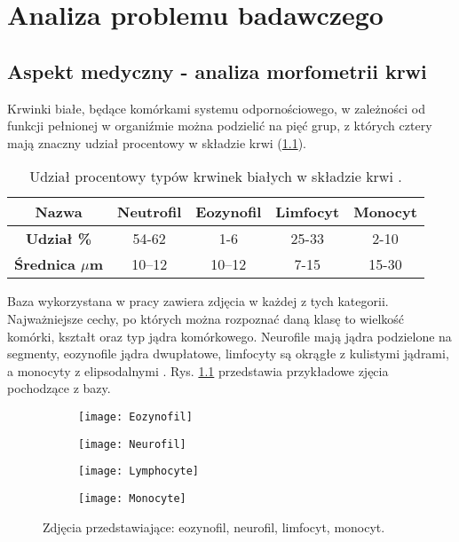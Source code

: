 \chapter{Analiza problemu badawczego}
\label{cha:analiza_problemu_badawczego}

\section{Aspekt medyczny - analiza morfometrii krwi}
Krwinki białe, będące komórkami systemu odpornościowego, w zależności od funkcji pełnionej w organiźmie można podzielić na pięć grup, z których cztery mają znaczny udział procentowy w składzie krwi (\ref{tab:blood_cells_percentage}).
\begin{table}[h!]
\centering
\caption[Short Heading]{Udział procentowy typów krwinek białych w składzie krwi \cite{Wheater1979FunctionalHA}.}
\label{tab:blood_cells_percentage}
\begin{tabular}{|c|c|c|c|c|}
\hline
\textbf{Nazwa}                               & Neutrofil & Eozynofil & Limfocyt & Monocyt \\ \hline
\textbf{Udział \%} & 54-62   & 1-6    & 25-33  & 2-10  \\ \hline
\textbf{Średnica  \textbf{$\mu$}m} & 10–12  & 10–12 & 7-15  & 15-30  \\ \hline
\end{tabular}
\end{table}

{\parindent0pt %
Baza wykorzystana w pracy zawiera zdjęcia w każdej z tych kategorii. Najważniejsze cechy, po których można rozpoznać daną klasę to wielkość komórki, kształt oraz typ jądra komórkowego. Neurofile mają jądra podzielone na segmenty, eozynofile jądra dwupłatowe, limfocyty są okrągłe z kulistymi jądrami, a monocyty z elipsodalnymi \cite{lymphocytes_nucleus}. Rys. \ref{fig:subcaption_example} przedstawia przykładowe zjęcia pochodzące z bazy.
\begin{figure}[h!]
	\centering
	\begin{subfigure}{0.35\textwidth}
		\centering
		\texttt{[image: Eozynofil]}
		\subcaption{\label{subfigure_a}}
	\end{subfigure}
	\begin{subfigure}{0.35\textwidth}
		\centering
		\texttt{[image: Neurofil]}
		\subcaption{\label{subfigure_b}}
	\end{subfigure}
	\begin{subfigure}{0.35\textwidth}
		\centering
		\texttt{[image: Lymphocyte]}
		\subcaption{\label{subfigure_c}}
	\end{subfigure}
	\begin{subfigure}{0.35\textwidth}
		\centering
		\texttt{[image: Monocyte]}
		\subcaption{\label{subfigure_d}}
	\end{subfigure}
	
	\caption{Zdjęcia przedstawiające: \protect{} eozynofil, \protect{} neurofil,  \protect{} limfocyt,  \protect{} monocyt.}
	\label{fig:subcaption_example}
\end{figure}
}
